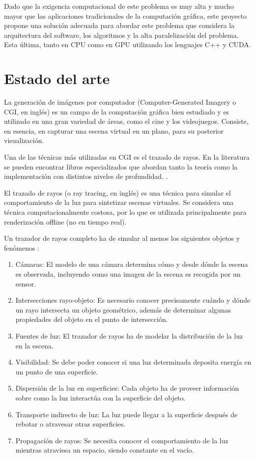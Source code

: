 \documentclass[10pt, a4paper]{article}
\begin{document}
Dado que la exigencia computacional de este problema es muy alta y mucho mayor que las aplicaciones tradicionales de la computación gráfica, este proyecto propone una solución adecuada para abordar este problema que considera la arquitectura del software, los algoritmos y la alta paralelización del problema. Esta última, tanto en CPU como en GPU utilizando los lenguajes C++ y CUDA.

\section{Estado del arte}

La generación de imágenes por computador (Computer-Generated Imagery o CGI, en inglés) es un campo de la computación gráfica bien estudiado y es utilizado en una gran variedad de áreas, como el cine y los videojuegos. Consiste, en esencia, en capturar una escena virtual en un plano, para su posterior visualización.

Una de las técnicas más utilizadas en CGI es el trazado de rayos. En la literatura se pueden encontrar libros especializados que abordan tanto la teoría como la implementación con distintos niveles de profundidad. \cite{Shirley:2024} \cite{Pharr:2023}.

El trazado de rayos (o ray tracing, en inglés) es una técnica para simular el comportamiento de la luz para sintetizar escenas virtuales. Se considera una técnica computacionalmente costosa, por lo que es utilizada principalmente para renderización offline (no en tiempo real).

Un trazador de rayos completo ha de simular al menos los siguientes objetos y fenómenos \cite{Pharr:2023}: 

\begin{enumerate}
\item Cámaras: El modelo de una cámara determina cómo y desde dónde la escena es observada, incluyendo como una imagen de la escena es recogida por un sensor.
\item Intersecciones rayo-objeto: Es necesario conocer precisamente cuándo y dónde un rayo intersecta un objeto geométrico, además de determinar algunas propiedades del objeto en el punto de intersección.
\item Fuentes de luz: El trazador de rayos ha de modelar la distribución de la luz en la escena.
\item Visibilidad: Se debe poder conocer si una luz determinada deposita energía en un punto de una superficie.
\item Dispersión de la luz en superficies: Cada objeto ha de proveer información sobre como la luz interactúa con la superficie del objeto.
\item Transporte indirecto de luz: La luz puede llegar a la superficie después de rebotar o atravesar otras superficies.
\item Propagación de rayos: Se necesita conocer el comportamiento de la luz mientras atraviesa un espacio, siendo constante en el vacío.
\end{enumerate}
\end{document}
